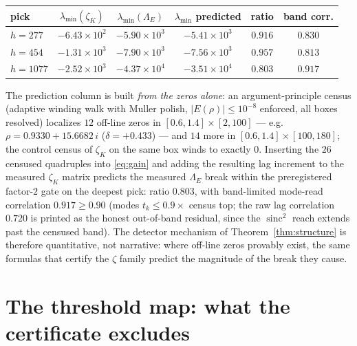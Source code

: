 \documentclass[11pt,a4paper]{article}
\theoremstyle{remark}
\newcommand{\Lam}{\Lambda}
\DeclareMathOperator{\sinc}{sinc}
\begin{document}
\begin{center}
\small
\setlength{\tabcolsep}{5pt}
\begin{tabular}{lccccc}
\toprule
pick & $\lambda_{\min}(\zeta_K)$ & $\lambda_{\min}(\Lam_E)$ &
$\lambda_{\min}$ predicted & ratio & band corr.\\
\midrule
$h=277$  & $-6.43\times10^{2}$ & $-5.90\times10^{3}$ &
$-5.41\times10^{3}$ & $0.916$ & $0.830$\\
$h=454$  & $-1.31\times10^{3}$ & $-7.90\times10^{3}$ &
$-7.56\times10^{3}$ & $0.957$ & $0.813$\\
$h=1077$ & $-2.52\times10^{3}$ & $-4.37\times10^{4}$ &
$-3.51\times10^{4}$ & $0.803$ & $0.917$\\
\bottomrule
\end{tabular}
\end{center}

The prediction column is built \emph{from the zeros alone}: an
argument-principle census (adaptive winding walk with Muller polish,
$|E(\rho)|\le10^{-8}$ enforced, all boxes resolved) localizes $12$
off-line zeros in $[0.6,1.4]\times[2,100]$ --- e.g.\
$\rho=0.9330+15.6682\,i$ ($\delta=+0.433$) --- and $14$ more in
$[0.6,1.4]\times[100,180]$; the control census of $\zeta_K$ on the same
box winds to exactly $0$.  Inserting the $26$ censused quadruples into
\eqref{eq:gain} and adding the resulting lag increment to the measured
$\zeta_K$ matrix predicts the measured $\Lam_E$ break within the
preregistered factor-$2$ gate on the deepest pick: ratio $0.803$, with
band-limited mode-read correlation $0.917\ge0.90$ (modes
$t_k\le0.9\times$ census top; the raw lag correlation $0.720$ is
printed as the honest out-of-band residual, since the $\sinc^2$ reach
extends past the censused band).  The detector mechanism of
Theorem~\ref{thm:structure} is therefore quantitative, not narrative:
where off-line zeros provably exist, the same formulas that certify the
$\zeta$ family predict the magnitude of the break they cause.

\section{The threshold map: what the certificate excludes}
\label{sec:map}
\end{document}

